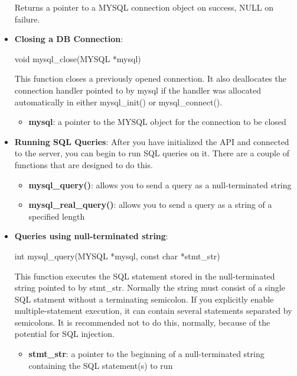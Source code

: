 \documentclass{report}
\begin{document}
\begin{itemize}
\begin{itemize}
            \end{itemize}
            \bigbreak \noindent 
            Returns a pointer to a MYSQL connection object on success, NULL on failure.
        \item \textbf{Closing a DB Connection}:
            \bigbreak \noindent 
            \begin{cppcode}
            void mysql_close(MYSQL *mysql)
            \end{cppcode}
            \bigbreak \noindent 
            This function closes a previously opened connection. It also deallocates the connection handler pointed to by mysql if the handler was allocated automatically in either mysql\_init() or mysql\_connect().
            \bigbreak \noindent 
            \begin{itemize}
                \item \textbf{mysql}: a pointer to the MYSQL object for the connection to be closed
            \end{itemize}
        \item \textbf{Running SQL Queries}: After you have initialized the API and connected to the server, you can begin to run SQL queries on it. There are a couple of functions that are designed to do this.
            \begin{itemize}
                \item \textbf{mysql\_query()}: allows you to send a query as a null-terminated string
                \item \textbf{mysql\_real\_query()}: allows you to send a query as a string of a specified length
            \end{itemize}
        \item \textbf{Queries using null-terminated string}:
            \bigbreak \noindent 
            \begin{cppcode}
            int mysql_query(MYSQL *mysql, const char *stmt_str)
            \end{cppcode}
            \bigbreak \noindent 
            This function executes the SQL statement stored in the null-terminated string pointed to by stmt\_str. Normally the string must consist of a single SQL statment without a terminating semicolon. If you explicitly enable multiple-statement execution, it can contain several statements separated by semicolons. It is recommended not to do this, normally, because of the potential for SQL injection.
            \bigbreak \noindent 
            \begin{itemize}
                \item \textbf{stmt\_str}: a pointer to the beginning of a null-terminated string containing the SQL statement(s) to run

\end{itemize}
\end{itemize}
\end{document}
